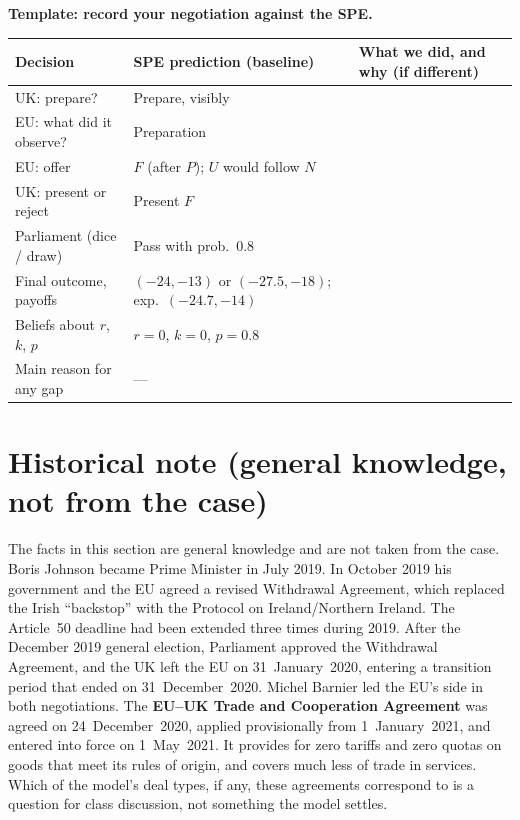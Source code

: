 \documentclass[11pt,a4paper]{article}
\newcommand{\dF}{\mathit{F}}
\newcommand{\dU}{\mathit{U}}
\begin{document}
\textbf{Template: record your negotiation against the SPE.}

\begin{center}
\small
\begin{tabularx}{\textwidth}{>{\raggedright\arraybackslash}p{3.3cm}>{\raggedright\arraybackslash}p{4.3cm}X}
\toprule
Decision & SPE prediction (baseline) & What we did, and why (if different) \\
\midrule
UK: prepare? & Prepare, visibly & \\[14pt]
EU: what did it observe? & Preparation & \\[14pt]
EU: offer & $\dF$ (after $P$); $\dU$ would follow $N$ & \\[14pt]
UK: present or reject & Present $\dF$ & \\[14pt]
Parliament (dice / draw) & Pass with prob.\ 0.8 & \\[14pt]
Final outcome, payoffs & $(-24,-13)$ or $(-27.5,-18)$; exp.\ $(-24.7,-14)$ & \\[14pt]
Beliefs about $r$, $k$, $p$ & $r=0$, $k=0$, $p=0.8$ & \\[14pt]
Main reason for any gap & --- & \\[14pt]
\bottomrule
\end{tabularx}
\end{center}

\section{Historical note (general knowledge, not from the case)}

The facts in this section are general knowledge and are not taken from the case. Boris Johnson
became Prime Minister in July 2019. In October 2019 his government and the EU agreed a revised
Withdrawal Agreement, which replaced the Irish ``backstop'' with the Protocol on Ireland/Northern
Ireland. The Article~50 deadline had been extended three times during 2019. After the December 2019
general election, Parliament approved the Withdrawal Agreement, and the UK left the EU on
31~January~2020, entering a transition period that ended on 31~December~2020. Michel Barnier led the EU's
side in both negotiations. The \textbf{EU--UK Trade and Cooperation Agreement} was agreed on
24~December~2020, applied provisionally from 1~January~2021, and entered into force on 1~May~2021.
It provides for zero tariffs and zero quotas on goods that meet its rules of origin, and covers
much less of trade in services. Which of the model's deal types, if any, these agreements
correspond to is a question for class discussion, not something the model settles.
\end{document}
